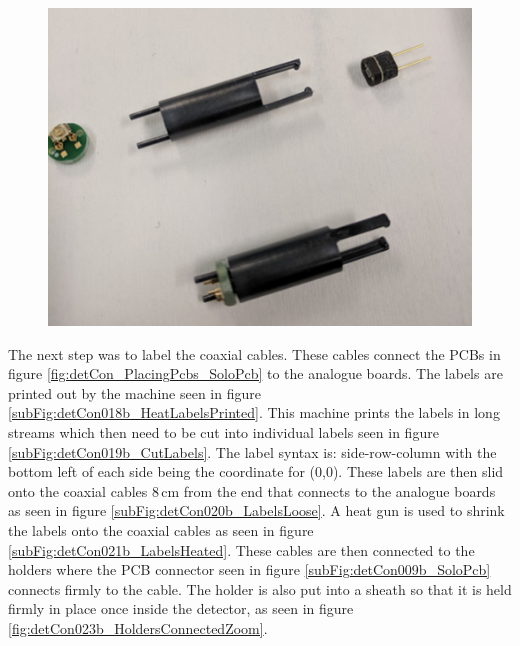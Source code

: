 \begin{figure}[htbp]
\centering
\includegraphics[width=0.8\linewidth]{Chapter3/Figs/Raster/detCon017b_HoldersWithParts.png}
\label{fig:detCon017b_HoldersWithParts}
\end{figure}

The next step was to label the coaxial cables. These cables connect the PCBs in figure \ref{fig:detCon_PlacingPcbs_SoloPcb} to the analogue boards. The labels are printed out by the machine seen in figure  \ref{subFig:detCon018b_HeatLabelsPrinted}. This machine prints the labels in long streams which then need to be cut into individual labels seen in figure \ref{subFig:detCon019b_CutLabels}. The label syntax is: side-row-column with the bottom left of each side being the coordinate for (0,0). These labels are then slid onto the coaxial cables 8\,cm from the end that connects to the analogue boards as seen in figure \ref{subFig:detCon020b_LabelsLoose}. A heat gun is used to shrink the labels onto the coaxial cables as seen in figure \ref{subFig:detCon021b_LabelsHeated}. These cables are then connected to the holders where the PCB connector seen in figure \ref{subFig:detCon009b_SoloPcb} connects firmly to the cable. The holder is also put into a sheath so that it is held firmly in place once inside the detector, as seen in figure \ref{fig:detCon023b_HoldersConnectedZoom}.

